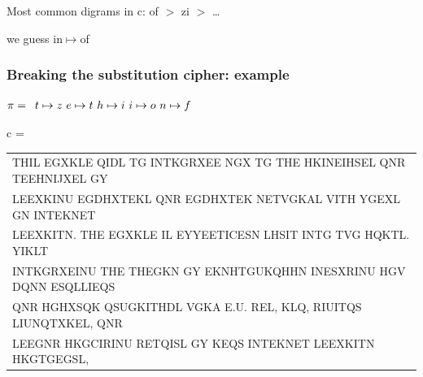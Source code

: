 \documentclass[aspectratio=169, lualatex, handout, 10pt,dvipsnames,svgnames]{beamer} %
\def\enbleu#1{\textcolor{bleu}{#1}}
\def\enrouge#1{\textcolor{rouge}{#1}}
\begin{document}
\begin{frame}
  \color{black}\normalsize{Most common digrams in c: of $>$ zi $>$ \dots}
  \pause

  we guess in$\mapsto$of
  
  \color{black}
\end{frame}

\begin{frame}
  \frametitle{Breaking the substitution cipher: example}
  
    \enrouge{
    \tiny{$\pi=
      \begin{array}[t]{l}
      t\mapsto z\ e\mapsto t\ h\mapsto i\ i\mapsto o\ n\mapsto f
      \end{array}
      $}}
  \vspace{0.25cm}

  \color{vert}
  \tiny{c =
    \begin{tabular}[t]{l}
      \enbleu{T}\enbleu{H}\enbleu{I}L EGXKL\enbleu{E} Q\enbleu{I}DL \enbleu{T}G \enbleu{I}\enbleu{N}\enbleu{T}KGRXE\enbleu{E} NGX \enbleu{T}G \enbleu{T}\enbleu{H}\enbleu{E} HK\enbleu{I}\enbleu{N}E\enbleu{I}HS\enbleu{E}L Q\enbleu{N}R \enbleu{T}\enbleu{E}E\enbleu{H}\enbleu{N}\enbleu{I}JX\enbleu{E}L GY \\
      L\enbleu{E}EXK\enbleu{I}\enbleu{N}U EGDHX\enbleu{T}\enbleu{E}KL Q\enbleu{N}R EGDHX\enbleu{T}\enbleu{E}K \enbleu{N}\enbleu{E}\enbleu{T}VGKAL V\enbleu{I}\enbleu{T}\enbleu{H} YGEXL G\enbleu{N} \enbleu{I}\enbleu{N}\enbleu{T}\enbleu{E}K\enbleu{N}\enbleu{E}\enbleu{T} \\
      L\enbleu{E}EXK\enbleu{I}\enbleu{T}N. \enbleu{T}\enbleu{H}\enbleu{E} EGXKL\enbleu{E} \enbleu{I}L \enbleu{E}YY\enbleu{E}E\enbleu{T}\enbleu{I}C\enbleu{E}SN LHS\enbleu{I}\enbleu{T} \enbleu{I}\enbleu{N}\enbleu{T}G \enbleu{T}VG HQK\enbleu{T}L. Y\enbleu{I}KL\enbleu{T} \\
      \enbleu{I}\enbleu{N}\enbleu{T}KGRXE\enbleu{I}\enbleu{N}U \enbleu{T}\enbleu{H}\enbleu{E} \enbleu{T}\enbleu{H}\enbleu{E}GKN GY EKNH\enbleu{T}GUKQH\enbleu{H}N \enbleu{I}\enbleu{N}ESXR\enbleu{I}\enbleu{N}U \enbleu{H}GV DQ\enbleu{N}N ESQLL\enbleu{I}EQS \\
      Q\enbleu{N}R HGHXSQK QSUGK\enbleu{I}\enbleu{T}\enbleu{H}DL VGKA \enbleu{E}.U. R\enbleu{E}L, KLQ, R\enbleu{I}U\enbleu{I}\enbleu{T}QS L\enbleu{I}U\enbleu{N}Q\enbleu{T}XK\enbleu{E}L, Q\enbleu{N}R \\
      L\enbleu{E}EG\enbleu{N}R HKGC\enbleu{I}R\enbleu{I}\enbleu{N}U R\enbleu{E}\enbleu{T}Q\enbleu{I}SL GY K\enbleu{E}QS \enbleu{I}\enbleu{N}\enbleu{T}\enbleu{E}K\enbleu{N}\enbleu{E}\enbleu{T} L\enbleu{E}EXK\enbleu{I}\enbleu{T}N HKG\enbleu{T}GEGSL, \\

\end{tabular}}
\end{frame}
\end{document}
